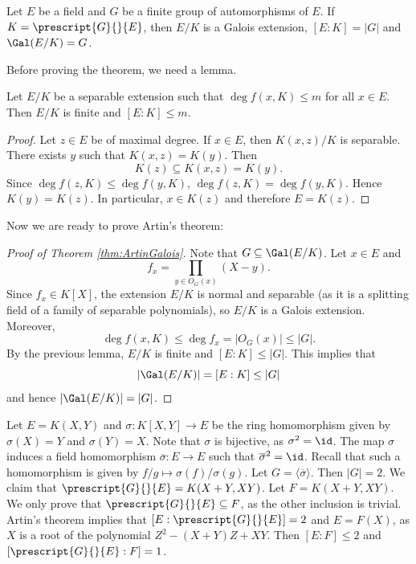 \begin{theorem}[Artin]
\label{thm:ArtinGalois}
    Let $E$ be a field and $G$ be a finite group of automorphisms of $E$. 
    If $K=\prescript{G}{}{E}$, then $E/K$ is a Galois extension,
    $[E:K]=|G|$ and $\Gal(E/K)=G$. 
\end{theorem}

Before proving the theorem, we need a lemma.

\begin{lemma}
    Let $E/K$ be a separable extension such that $\deg f(x,K)\leq m$
    for all $x\in E$. Then $E/K$ is finite and $[E:K]\leq m$. 
\end{lemma}

\begin{proof}
   Let $z\in E$ be of maximal degree. If $x\in E$, 
   then $K(x,z)/K$ is separable. There exists $y$ such that $K(x,z)=K(y)$. Then 
   \[
   K(z)\subseteq K(x,z)=K(y).
   \]
   Since 
   $\deg f(z,K)\leq\deg f(y,K)$, 
   $\deg f(z,K)=\deg f(y,K)$. Hence 
   $K(y)=K(z)$. In particular, $x\in K(z)$ and
   therefore $E=K(z)$. 
\end{proof}

Now we are ready to prove Artin's theorem: 

\begin{proof}[Proof of Theorem \ref{thm:ArtinGalois}]
    Note that $G\subseteq\Gal(E/K)$. Let $x\in E$ and 
    \[
    f_x=\prod_{y\in O_G(x)}(X-y).
    \]
    Since $f_x\in K[X]$, the extension $E/K$ is normal and separable (as it is a splitting
    field of a family of separable polynomials), so $E/K$ is a Galois extension. Moreover, 
    \[
    \deg f(x,K)\leq \deg f_x=|O_G(x)|\leq |G|.
    \]
    By the previous lemma, $E/K$ is finite and $[E:K]\leq |G|$. This
    implies that
    \[
    |\Gal(E/K)|=[E:K]\leq |G|
    \]
    and hence $|\Gal(E/K)|=|G|$. 
\end{proof}

\begin{example}
    Let $E=K(X,Y)$ and $\sigma\colon K[X,Y]\to E$ be the ring homomorphism given by $\sigma(X)=Y$ and $\sigma(Y)=X$. Note that $\sigma$ is bijective, as $\sigma^2=\id$. The map $\sigma$ induces
    a field homomorphism $\overline{\sigma}\colon E\to E$ such that 
    $\overline{\sigma}^2=\id$. Recall that such a homomorphism is given by 
    $f/g\mapsto \sigma(f)/\sigma(g)$. Let $G=\langle\overline{\sigma}\rangle$. Then $|G|=2$. 
    We claim that $\prescript{G}{}{E}=K(X+Y,XY)$. Let $F=K(X+Y,XY)$. We only prove
    that $\prescript{G}{}{E}\subseteq F$, as the other inclusion is trivial. Artin's theorem
    implies that $[E:\prescript{G}{}{E}]=2$ and $E=F(X)$, as $X$ is a root
    of the polynomial $Z^2-(X+Y)Z+XY$. Then $[E:F]\leq 2$ and $[\prescript{G}{}{E}:F]=1$.
\end{example}
